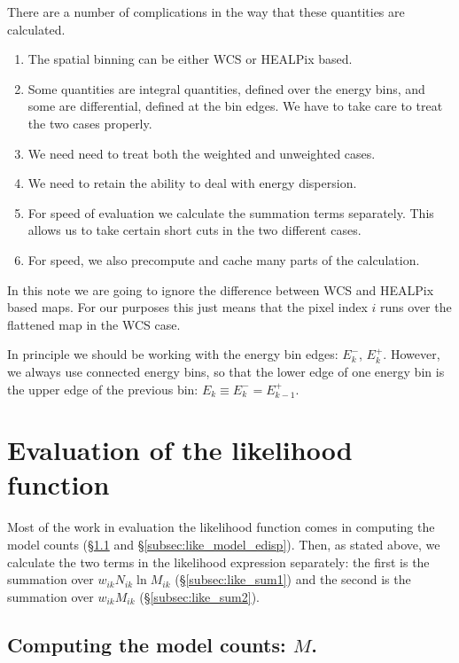 \documentclass[preprint]{aastex}
\begin{document}
There are a number of complications in the way that these quantities
are calculated.
\begin{enumerate}
\item The spatial binning can be either WCS or HEALPix based.
\item Some quantities are integral quantities, defined over the energy
  bins, and some are differential, defined at the bin edges.  We have
  to take care to treat the two cases properly.
\item We need need to treat both the weighted and unweighted cases.
\item We need to retain the ability to deal with energy dispersion.
\item For speed of evaluation we calculate the summation terms
  separately. This allows us to take certain short cuts in
  the two different cases.
\item For speed, we also precompute and cache many parts of the
  calculation.
\end{enumerate}

In this note we are going to ignore the difference between WCS and
HEALPix based maps.  For our purposes this just means that the pixel
index $i$ runs over the flattened map in the WCS case.

In principle we should be working with the energy bin edges: $E_k^-$,
$E_k^+$.  However, we always use connected energy bins, so that the
lower edge of one energy bin is the upper edge of the previous bin:
$E_k \equiv E_k^- = E_{k-1}^+$.


\section{Evaluation of the likelihood function}\label{sec:like}

Most of the work in evaluation the likelihood function comes in
computing the model counts (\S\ref{subsec:like_model_counts} and
\S\ref{subsec:like_model_edisp}).  Then, as stated above, we calculate
the two terms in the likelihood expression separately: the first is
the summation over $ w_{ik} N_{ik} \ln M_{ik}$ (\S\ref{subsec:like_sum1}) and
the second is the summation over $w_{ik} M_{ik}$ (\S\ref{subsec:like_sum2}).


\subsection{Computing the model counts: \texorpdfstring{$M$}{M}.}\label{subsec:like_model_counts}
\end{document}
